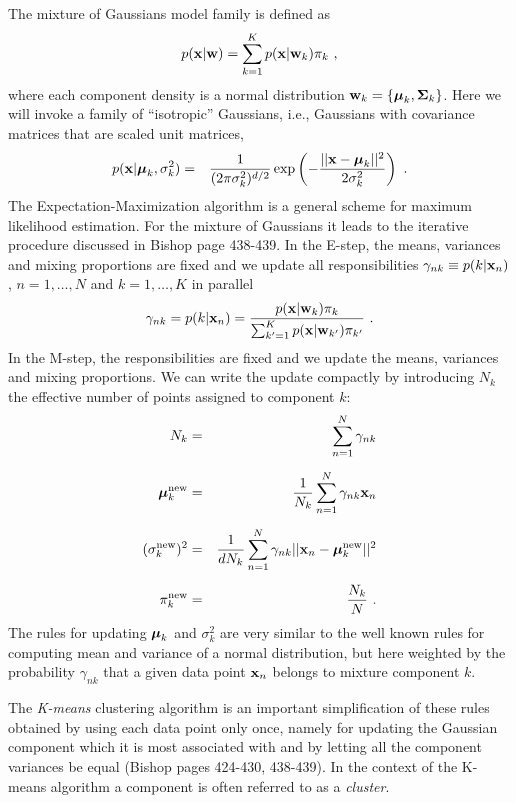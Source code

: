 \documentclass[times,12pt]{article}    %
\def\xb{{\bf x}}
\def\wb{{\bf w}}
\def\mub{\text{\boldmath $\mu$}}
\def\Sigb{\text{\boldmath $\Sigma$}}
\begin{document}
The mixture of Gaussians model family is defined as
\begin{eqnarray}
p(\xb|\wb) = \sum_{k=1}^{K} p(\xb|\wb_k)\pi_k \nonumber \ ,
\end{eqnarray}
where each component density is a normal distribution $\wb_k = \{
\mub_k,\Sigb_k\}$. Here we will invoke a family of ``isotropic''
Gaussians, i.e., Gaussians with covariance matrices that are
scaled unit matrices,
\begin{eqnarray}
p(\xb|\mub_k,\sigma^{2}_k) &=&
\frac{1}{(2\pi\sigma^{2}_{k})^{d/2}}\exp\left(-\frac{||\xb
-\mub_k||^2}{2\sigma^{2}_k}\right) \ . \nonumber
\end{eqnarray}
%
The Expectation-Maximization algorithm is a general scheme for
maximum likelihood estimation. For the mixture of Gaussians it leads to
the iterative procedure discussed in Bishop page 438-439. In the E-step, the means, variances and mixing
proportions are fixed and we 
update all responsibilities $\gamma_{nk}\equiv p(k|\xb_n)$, $n=1,\ldots,N$ and $k=1,\ldots,K$ in parallel
$$
\gamma_{nk} = p(k|\xb_n) =
\frac{p(\xb|\wb_k)\pi_k}{\sum_{k'=1}^{K} p(\xb|\wb_{k'})\pi_{k'}} \ .
$$
In the M-step, the responsibilities are fixed and we update the means, variances and mixing
proportions. We can write the update compactly by introducing $N_k$ the effective number of points assigned to component $k$:
\begin{eqnarray}
N_k & = & \sum_{n=1}^{N} \gamma_{nk} \nonumber\\[2mm] 
\mub^{\rm new}_k &= &\frac{1}{N_k}  \sum_{n=1}^{N} \gamma_{nk} \xb_n  \nonumber\\[2mm]
(\sigma^{\rm new}_k)^{2} &= &\frac{1}{d N_k} \sum_{n=1}^{N}
\gamma_{nk} ||\xb_n-\mub^{\rm new}_k||^2\nonumber\\[2mm]
\pi_k^{\rm new} &= &\frac{N_k}{N} \ . \nonumber
\end{eqnarray}
The rules for
updating $\mub_k$ and $\sigma^{2}_k$ are very similar to the well
known rules for computing mean and variance of a normal
distribution, but here weighted by the probability $\gamma_{nk}$
that a given data point $\xb_n$ belongs to mixture component $k$.

The {\it K-means} clustering algorithm is an important
simplification of these rules obtained by using each data point
only once, namely for updating the Gaussian component which it is
most associated with and by letting all the component variances be
equal (Bishop pages 424-430, 438-439). In the context of the
K-means algorithm a component is often referred to as a {\it
cluster}.
\end{document}
